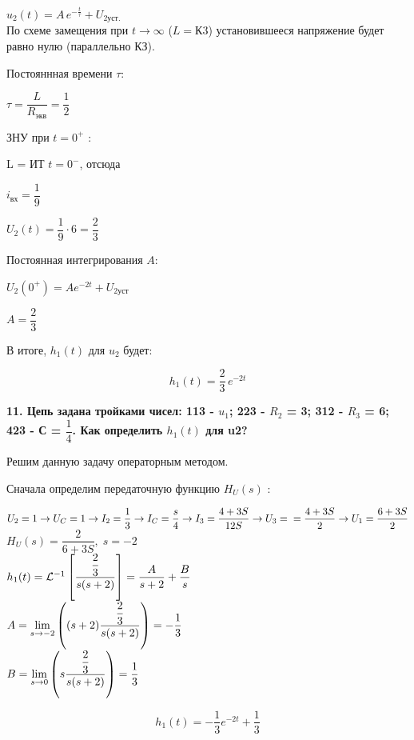 $ u_2(t) = A \, e^{-\frac{t}{\tau}} + U_{2уст.} $\\

По схеме замещения
при $ t \rightarrow \infty $ ($ L = К3 $)
установившееся напряжение будет равно нулю
(параллельно КЗ). 

Постояннная времени $ \tau $:

$ \tau = \dfrac{L}{R_{экв}} = \dfrac{1}{2} $

ЗНУ при $ t = 0^+ $ :

L = ИТ $ t =0^{-} $, отсюда 

$ i_{вх} =  \dfrac{1}{9} $

$ U_{2}(t) = \dfrac{1}{9} \cdot 6 = \dfrac{2}{3} $

Постоянная интегрирования $ A $:

$ U_{2}(0^+) = Ae^{-2t} + U_{2уст} $

$ A = \dfrac{2}{3} $

В итоге, 
$ h_{1}(t) $ для $ u_2 $ будет:

$$ h_{1}(t) = \dfrac{2}{3} \, e^{-2t} $$

\textbf{
    11. Цепь задана тройками чисел: 
    113 - $ u_1 $; 
    223 - $ R_2 $ = 3; 
    312 - $ R_3 $ = 6; 
    423 - С = $ \dfrac{1}{4} $. 
    Как определить $ h_{1}(t) $ для u2?
}

Решим данную задачу операторным методом. 

Сначала определим передаточную функцию 
$ H_{U}(s) $ : 

$ 
U_{2} = 
                  1 \rightarrow U_{C} =
                  1 \rightarrow I_{2} = 
       \dfrac{1}{3} \rightarrow I_{C} = 
       \dfrac{s}{4} \rightarrow I_{3} = 
\dfrac{4 + 3S}{12S} \rightarrow U_{3} =\\\\=
  \dfrac{4 + 3S}{2} \rightarrow U_{1} = \dfrac{6 + 3S}{2} 
$\\

$ H_{U}(s) = \dfrac{2}{6 + 3S} ,\; s = -2 $\\

$ 
h_{1}(t) = 
\lag{\dfrac{\dfrac{2}{3}}{s(s + 2)}} = 
\dfrac{A}{s + 2} + \dfrac{B}{s}
$\\

$ 
A = 
\mylim[s]{-2}{(s+2)\dfrac{\dfrac{2}{3}}{s(s + 2)}} =
-\dfrac{1}{3}
$\\

$ 
B = 
\mylim[s]{0}{s\dfrac{\dfrac{2}{3}}{s(s + 2)}} =
\dfrac{1}{3}
$

$$ h_{1}(t) = -\dfrac{1}{3} e^{-2t} + \dfrac{1}{3} $$

